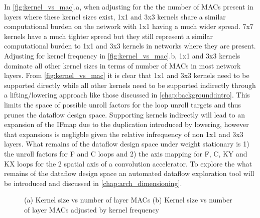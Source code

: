 In \autoref{fig:kernel_vs_mac}.a, when adjusting for the the number of MACs
present in layers where these kernel sizes exist, 1x1 and 3x3 kernels share a
similar computational burden on the network with 1x1 having a much wider spread.
7x7 kernels have a much tighter spread but they still represent a similar
computational burden to 1x1 and 3x3 kernels in networks where they are present.
Adjusting for kernel frequency in \autoref{fig:kernel_vs_mac}.b, 1x1 and 3x3
kernels dominate all other kernel sizes in terms of number of MACs in most
network layers. From \autoref{fig:kernel_vs_mac} it is clear that 1x1 and 3x3
kernels need to be supported directly while all other kernels need to be
supported indirectly through a lifting/lowering approach like those discussed in
\autoref{chap:background:intro}. This limits the space of possible unroll
factors for the loop unroll targets and thus prunes the dataflow design space.
Supporting kernels indirectly will lead to an expansion of the IFmap due to the
duplication introduced by lowering, however that expansions is negligble given
the relative infrequency of non 1x1 and 3x3 layers. What remains of the dataflow
design space under weight stationary is 1) the unroll factors for F and C loops
and 2) the axis mapping for F, C, KY and KX loops for the 2 spatial axis of a
convolution accelerator. To explore the what remains of the dataflow design
space an automated dataflow exploration tool will be introduced and discussed in
\autoref{chap:arch_dimensioning}.   

\clearpage
\begin{figure}
    \centering
    \caption{(a) Kernel size vs number of layer MACs  (b) Kernel size vs number of layer MACs adjusted by kernel frequency}
    \label{fig:kernel_vs_mac}
\end{figure}

